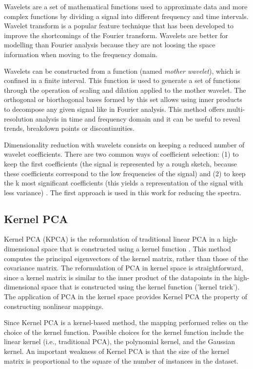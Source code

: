 \documentclass[a4paper,fleqn,usenatbib]{mnras}
\begin{document}
{Wavelets \citep{mallat:98} are a set of mathematical functions used to
approximate data and more complex functions by dividing a signal into
different frequency and time intervals.  Wavelet transform is a
popular feature technique that has been developed to improve the
shortcomings of the Fourier transform. Wavelets are better for
modelling than Fourier analysis because they are not loosing the space
information when moving to the frequency domain.

Wavelets can be constructed from a function (named \textit{mother
  wavelet}), which is confined in a finite interval. This function is
used to generate a set of functions through the operation of scaling
and dilation applied to the mother wavelet. The orthogonal or
biorthogonal bases formed by this set allows using inner products to
decompose any given signal like in Fourier analysis.  This method
offers multi-resolution analysis in time and frequency domain and it
can be useful to reveal trends, breakdown points or discontinuities.

Dimensionality reduction with wavelets consists on keeping a reduced
number of wavelet coefficients. There are two common ways of
coefficient selection: (1) to keep the first coefficients (the signal
is represented by a rough sketch, because these coefficients
correspond to the low frequencies of the signal) and (2) to keep the k
most significant coefficients (this yields a representation
  of the signal with less variance) \citep{li:10}. The first
approach is used in this work for reducing the spectra.

\subsection{Kernel PCA}

Kernel PCA (KPCA) is the reformulation of traditional linear PCA in a
high-dimensional space that is constructed using a kernel function
\citep{sholkopf:98}. This method computes the principal eigenvectors of
the kernel matrix, rather than those of the covariance matrix. The
reformulation of PCA in kernel space is straightforward, since a
kernel matrix is similar to the inner product of the datapoints in the
high-dimensional space that is constructed using the kernel function
('kernel trick'). The application of PCA in the kernel space provides
Kernel PCA the property of constructing nonlinear mappings.

Since Kernel PCA is a kernel-based method, the mapping performed
relies on the choice of the kernel function. Possible choices for the
kernel function include the linear kernel (i.e., traditional PCA), the
polynomial kernel, and the Gaussian kernel. An important weakness of
Kernel PCA is that the size of the kernel matrix is proportional to
the square of the number of instances in the dataset.

}
\end{document}
